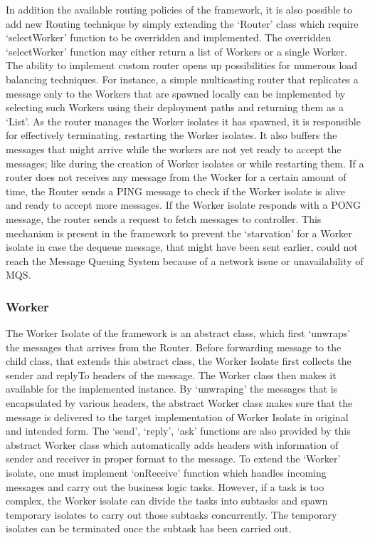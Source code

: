     In addition the available routing policies of the framework, it is also possible to add new Routing technique by simply extending the ‘Router’ class which require ‘selectWorker’ function to be overridden and implemented. The overridden ‘selectWorker’ function may either return a list of Workers or a single Worker. The ability to implement custom router opens up possibilities for numerous load balancing techniques. For instance, a simple multicasting router that replicates a message only to the Workers that are spawned locally can be implemented by selecting such Workers using their deployment paths and returning them as a ‘List’.
    As the router manages the Worker isolates it has spawned, it is responsible for effectively terminating, restarting the Worker isolates. It also buffers the messages that might arrive while the workers are not yet ready to accept the messages; like during the creation of Worker isolates or while restarting them.
    If a router does not receives any message from the Worker for a certain amount of time, the Router sends a PING message to check if the Worker isolate is alive and ready to accept more messages. If the Worker isolate responds with a PONG message, the router sends a request to fetch messages to controller. This mechanism is present in the framework to prevent the ‘starvation’ for a Worker isolate in case the dequeue message, that might have been sent earlier, could not reach the Message Queuing System because of a network issue or unavailability of MQS.

  \subsubsection{Worker}
  The Worker Isolate of the framework is an abstract class, which first ‘unwraps’ the messages that arrives from the Router. Before forwarding message to the child class, that extends this abstract class, the Worker Isolate first collects the sender and replyTo headers of the message. The Worker class then makes it available for the implemented instance. By ‘unwraping’ the messages that is encapsulated by various headers, the abstract Worker class makes sure that the message is delivered to the target implementation of Worker Isolate in original and intended form.
  The ‘send’, ‘reply’, ‘ask’ functions are also provided by this abstract Worker class which automatically adds headers with information of sender and receiver in proper format to the message.
  To extend the ‘Worker’ isolate, one must implement ‘onReceive’ function which handles incoming messages and carry out the business logic tasks. However, if a task is too complex, the Worker isolate can divide the tasks into subtasks and spawn temporary isolates to carry out those subtasks concurrently. The temporary isolates can be terminated once the subtask has been carried out.

